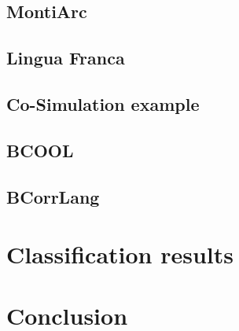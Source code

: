 \documentclass[runningheads]{llncs}
\begin{document}
\subsection{MontiArc} %
\subsection{Lingua Franca} %
\subsection{Co-Simulation example} %
\subsection{BCOOL} %
\subsection{BCorrLang} %



\section{Classification results}




\section{Conclusion} \label{sec:conclusion}



\end{document}
